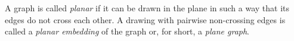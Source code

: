 

\setcounter{section}{3}
\setcounter{subsection}{1}
\setcounter{dfn}{0}

\begin{dfn}
A graph is called \emph{planar} if it can be drawn in the plane in such a way that its edges do not cross each other.
A drawing with pairwise non-crossing edges is called a \emph{planar embedding} of the graph or, for short, a \emph{plane graph}.
\end{dfn}


